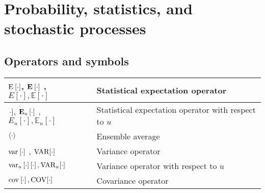 \section{Probability, statistics, and stochastic processes}
\subsection{Operators and symbols}
\begin{xltabular}{\textwidth}{XX}
	\(\E{\cdot}\), \(\nossekE{\cdot}\) \cite{nossekAdaptiveArraySignal2015}, \(E\left[ \cdot \right], \mathbb{E}\left[ \cdot \right]\) \cite{dinizAdaptiveFilteringAlgorithms2002}                                                          & Statistical expectation operator                                                            \\ \hline
	\(\E[u]{\cdot}\), \(\nossekE[u]{\cdot}\) \cite{nossekAdaptiveArraySignal2015}, \(E_u\left[ \cdot \right], \mathbb{E}_u\left[ \cdot \right]\)                                                                                            & Statistical expectation operator with respect to \(u\)                                      \\ \hline
	\(\expval{\cdot}\)                                                                                                                                                                                                                      & Ensemble average                                                                            \\ \hline
	\(\var{\cdot}\) \cite{nossekAdaptiveArraySignal2015}, \(\textnormal{VAR}[\cdot]\) \cite{haykinAdaptiveFilterTheory2002,leon-garciaProbabilityStatisticsRandom2007,proakisDigitalCommunications2007,bishopPatternRecognitionMachine2006} & Variance operator                                                                           \\ \hline
	\(\var[u]{\cdot} \left[ \cdot \right], \textnormal{VAR}_u[\cdot]\)                                                                                                                                                                      & Variance operator with respect to \(u\)                                                     \\ \hline
	\(\cov{\cdot}, \textnormal{COV}[\cdot]\)                                                                                                                                                                                                & Covariance operator \cite{bishopPatternRecognitionMachine2006}                              \\ \hline

\end{xltabular}
